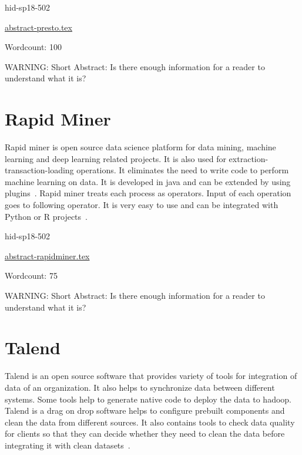 \begin{IU}

hid-sp18-502

\href{https://github.com/cloudmesh-community/hid-sp18-502/blob/master//technology/abstract-presto.tex}{abstract-presto.tex}

 

Wordcount: 100

WARNING: Short Abstract: Is there enough information for a reader to understand what it is?

\end{IU}

\section{Rapid Miner}

Rapid miner is open source data science platform for data mining, machine
learning and deep learning related projects. It is also used for
extraction-transaction-loading operations. It eliminates the need to write code
to perform machine learning on data. It is developed in java and can be extended
 by using plugins~\cite{hid-sp18-502-RapidMiner}.
Rapid miner treats each process as operators. Input of each operation goes to
following operator. It is very easy to use and can be integrated with Python or
R projects~\cite{hid-sp18-502-RapidMiner}.





\begin{IU}

hid-sp18-502

\href{https://github.com/cloudmesh-community/hid-sp18-502/blob/master//technology/abstract-rapidminer.tex}{abstract-rapidminer.tex}

 

Wordcount: 75

WARNING: Short Abstract: Is there enough information for a reader to understand what it is?

\end{IU}

\section{Talend}

Talend is an open source software that provides variety of tools for integration
 of data of an organization. It also helps to synchronize data between different
 systems. Some tools help to generate native code to deploy the data to hadoop.
Talend is a drag on drop software helps to configure prebuilt components and
clean the data from different sources. It also contains tools to check data
quality for clients so that they can decide whether they need to clean the data
before integrating it with clean datasets~\cite{hid-sp18-502-Talend}.





